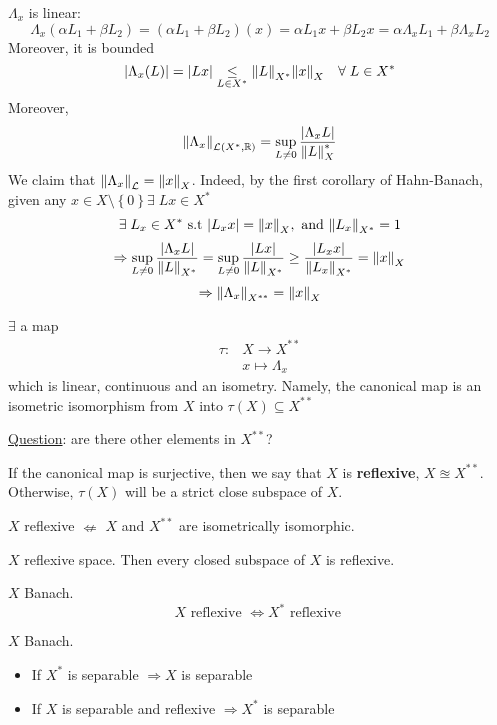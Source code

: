 \(\Lambda_x\) is linear:
\[
    \Lambda_x (\alpha L_1 + \beta L_2) = (\alpha L_1 + \beta L_2)(x) = \alpha L_1 x + \beta L_2 x = \alpha \Lambda_x L_1 + \beta \Lambda_x L_2
\]
Moreover, it is bounded 
\[
    \abs{\Lambda_x(L)} = \abs{Lx} \underset{L \in X^*}{\leq} \norm{L}_{X^*}\norm{x}_X \quad \forall \; L \in X^*
\]
Moreover, 
\[
    \norm{\Lambda_x}_{\mathcal{L}(X^*, \mathbb{R})} = \sup_{L \neq 0} \frac{\abs{\Lambda_x L}}{\norm{L}_X^*}
\]
We claim that \(\norm{\Lambda_x}_{\mathcal{L}} = \norm{x}_X\). Indeed, by the first corollary of Hahn-Banach, given any \(x \in X\setminus \left\{ 0 \right\} \exists \; Lx \in X^*\) 
\[
    \exists \; L_x \in X^* \mbox{ s.t } \abs{L_x x} = \norm{x}_X, \mbox{ and } \norm{L_x}_{X^*} = 1 
\]
\[
    \Rightarrow \sup_{L \neq 0} \frac{\abs{\Lambda_x L}}{\norm{L}_{X^*}} = \sup_{L \neq 0} \frac{\abs{Lx}}{\norm{L}_{X^*}} \geq \frac{\abs{L_x x}}{\norm{L_x}_{X^*}} = \norm{x}_X 
\]
\[
    \Rightarrow \norm{\Lambda_x}_{X^{**}} = \norm{x}_X
\]
\begin{theorem}
    \(\exists\) a map 
    \[
        \begin{array}{lc}
            \tau : & X \to X^{**} \\
            & x \mapsto \Lambda_x
        \end{array}
    \tag*{(Canonical Map)}\]
    which is linear, continuous and an isometry. Namely, the canonical map is an isometric isomorphism from \(X\) into \(\tau(X) \subseteq X^{**}\)
\end{theorem}
\noindent\underline{Question}: are there other elements in \(X^{**}\)?
\begin{definition}
    If the canonical map is surjective, then we say that \(X\) is \textbf{reflexive}, \(X \approxeq X^{**}\). Otherwise, \(\tau(X)\) will be a strict close subspace of \(X\).
\end{definition}
\begin{remark}
    \(X\) reflexive \(\nLeftarrow\) \(X\) and \(X^{**}\) are isometrically isomorphic.
\end{remark}
\begin{theorem}
    \(X\) reflexive space. Then every closed subspace of \(X\) is reflexive.
\end{theorem}
\begin{theorem}
    \(X\) Banach. 
    \[
        X \mbox{ reflexive } \Leftrightarrow X^* \mbox{ reflexive }
    \]
\end{theorem}
\begin{theorem}
    \(X\) Banach.
    \begin{itemize}
        \item If \(X^*\) is separable \(\Rightarrow X\) is separable
        \item If \(X\) is separable and reflexive \(\Rightarrow X^*\) is separable
    \end{itemize}
\end{theorem}
